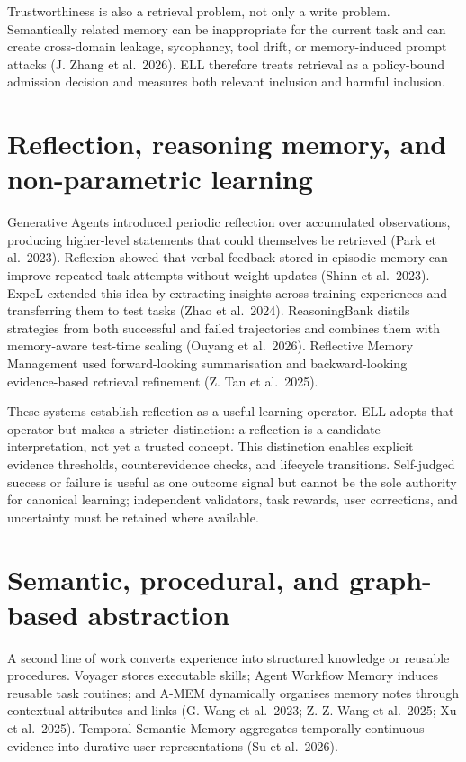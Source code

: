 \documentclass[
  english,
  a4paper,
  DIV=11,
  numbers=noendperiod]{scrreprt}
\begin{document}
Trustworthiness is also a retrieval problem, not only a write problem.
Semantically related memory can be inappropriate for the current task
and can create cross-domain leakage, sycophancy, tool drift, or
memory-induced prompt attacks (J. Zhang et al.~2026). ELL therefore
treats retrieval as a policy-bound admission decision and measures both
relevant inclusion and harmful inclusion.

\section{Reflection, reasoning memory, and non-parametric
learning}\label{reflection-reasoning-memory-and-non-parametric-learning}

Generative Agents introduced periodic reflection over accumulated
observations, producing higher-level statements that could themselves be
retrieved (Park et al.~2023). Reflexion showed that verbal feedback
stored in episodic memory can improve repeated task attempts without
weight updates (Shinn et al.~2023). ExpeL extended this idea by
extracting insights across training experiences and transferring them to
test tasks (Zhao et al.~2024). ReasoningBank distils strategies from
both successful and failed trajectories and combines them with
memory-aware test-time scaling (Ouyang et al.~2026). Reflective Memory
Management used forward-looking summarisation and backward-looking
evidence-based retrieval refinement (Z. Tan et al.~2025).

These systems establish reflection as a useful learning operator. ELL
adopts that operator but makes a stricter distinction: a reflection is a
candidate interpretation, not yet a trusted concept. This distinction
enables explicit evidence thresholds, counterevidence checks, and
lifecycle transitions. Self-judged success or failure is useful as one
outcome signal but cannot be the sole authority for canonical learning;
independent validators, task rewards, user corrections, and uncertainty
must be retained where available.

\section{Semantic, procedural, and graph-based
abstraction}\label{semantic-procedural-and-graph-based-abstraction}

A second line of work converts experience into structured knowledge or
reusable procedures. Voyager stores executable skills; Agent Workflow
Memory induces reusable task routines; and A-MEM dynamically organises
memory notes through contextual attributes and links (G. Wang et
al.~2023; Z. Z. Wang et al.~2025; Xu et al.~2025). Temporal Semantic
Memory aggregates temporally continuous evidence into durative user
representations (Su et al.~2026).
\end{document}
